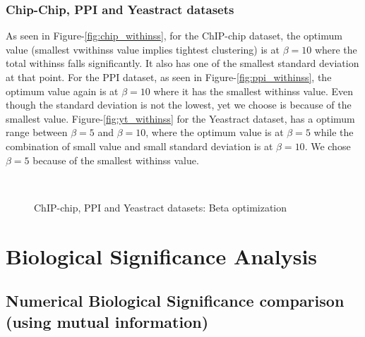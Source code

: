 \subsubsection{Chip-Chip, PPI and Yeastract datasets}
As seen in Figure-\ref{fig:chip_withinss}, for the ChIP-chip dataset, the optimum value (smallest vwithinss value implies tightest clustering) is at $\beta=10$ where the total 
withinss falls significantly. It also has one of the smallest standard deviation at that point. For the PPI dataset, as seen in Figure-\ref{fig:ppi_withinss}, the optimum 
value again is at $\beta=10$ where it has the smallest withinss value. Even though the standard deviation is not the lowest, yet we choose is because of the smallest value.
Figure-\ref{fig:yt_withinss} for the Yeastract dataset, has a optimum range between $\beta=5$ and $\beta=10$, where the optimum value is at $\beta=5$ while the combination of small value and small standard deviation 
is at $\beta=10$. We chose $\beta=5$ because of the smallest withinss value.    

\begin{figure}[htp]
  \begin{center}
     \\
  \end{center}
  \caption{ChIP-chip, PPI and Yeastract datasets: Beta optimization}
  \label{fig:chip_ppi_yt_opt}
\end{figure}

\section{Biological Significance Analysis}

\subsection{Numerical Biological Significance comparison (using mutual information)} \label{num_biosig_mi}
